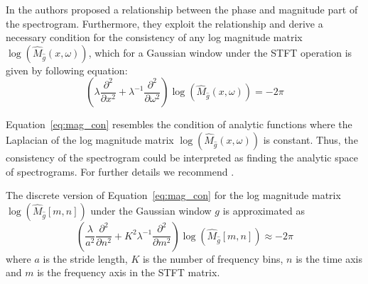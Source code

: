 In \citet{auger2012phase} the authors proposed a relationship between the phase and magnitude part of the spectrogram. Furthermore, they exploit the relationship and derive a necessary condition for the consistency of any log magnitude matrix $\log (\hat{M}_{\hat{g}}(x,\omega))$, which for a Gaussian window under the STFT operation is given by following equation:
\begin{equation}
    \label{eq:mag_con}
    (\lambda\frac{\partial^2}{\partial x^2} +   \lambda^{-1}\frac{\partial^2}{\partial \omega^2}) \log (\hat{M}_{\hat{g}}(x,\omega)) = - 2 \pi
\end{equation}

Equation~\ref{eq:mag_con} resembles the 
condition of analytic functions where
the Laplacian of the log magnitude matrix $\log (\hat{M}_{\hat{g}}(x,\omega))$ is constant. Thus, the consistency of the spectrogram could be interpreted as finding the analytic space of spectrograms. For further details we recommend \cite{auger2012phase}.


The discrete version of Equation~\ref{eq:mag_con} for the log magnitude matrix $\log (\hat{M}_{\hat{g}}[m,n])$
under the Gaussian window $g$ is approximated as
\begin{equation}
    \label{eq:mag_con_discrete}
    (\frac{\lambda}{a^2}\frac{\partial^2}{\partial n^2} +   K^2\lambda^{-1}\frac{\partial^2}{\partial m^2}) \log (\hat{M}_{\hat{g}}[m, n]) \approx - 2 \pi
\end{equation}
where $a$ is the stride length, $K$ is the number of frequency bins, $n$ is the time axis and $m$ is the frequency axis in the STFT matrix.

